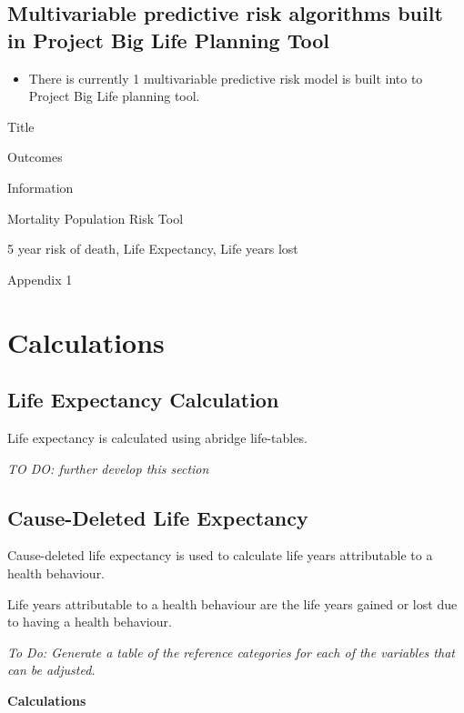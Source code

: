 \documentclass[]{book}
\providecommand{\tightlist}{%
  \setlength{\itemsep}{0pt}\setlength{\parskip}{0pt}}
\begin{document}
\subsection{Multivariable predictive risk algorithms built in Project
Big Life Planning
Tool}\label{multivariable-predictive-risk-algorithms-built-in-project-big-life-planning-tool}

\begin{itemize}
\tightlist
\item
  There is currently 1 multivariable predictive risk model is built into
  to Project Big Life planning tool.
\end{itemize}

Title

Outcomes

Information

Mortality Population Risk Tool

5 year risk of death, Life Expectancy, Life years lost

Appendix 1

\section{Calculations}\label{calculations}

\subsection{Life Expectancy
Calculation}\label{life-expectancy-calculation}

Life expectancy is calculated using abridge life-tables.

\emph{TO DO: further develop this section}

\subsection{Cause-Deleted Life
Expectancy}\label{cause-deleted-life-expectancy-1}





Cause-deleted life expectancy is used to calculate life years
attributable to a health behaviour.

Life years attributable to a health behaviour are the life years gained
or lost due to having a health behaviour.

\emph{To Do: Generate a table of the reference categories for each of
the variables that can be adjusted.}

\textbf{Calculations}
\end{document}

